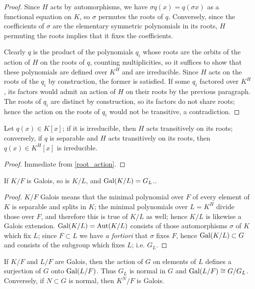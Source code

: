 \begin{proof} Since $H$ acts by automorphisms, we have $\sigma q(x) = q(\sigma
x)$ as a functional equation on $K$, so $\sigma$ permutes the roots of $q$.
Conversely, since the coefficients of $\sigma$ are the elementary symmetric
polynomials in its roots, $H$ permuting the roots implies that it fixes the
coefficients.

Clearly $q$ is the product of the polynomials $q_i$ whose roots are the orbits
of the action of $H$ on the roots of $q$, counting multiplicities, so it
suffices to show that these polynomials are defined over $K^H$ and are
irreducible.  Since $H$ acts on the roots of the $q_i$ by construction, the
former is satisfied.  If some $q_i$ factored over $K^H$, its factors would
admit an action of $H$ on their roots by the previous paragraph.  The roots of
$q_i$ are distinct by construction, so its factors do not share roots; hence
the action on the roots of $q_i$ would not be transitive, a contradiction.
\end{proof}

\begin{corollary} Let $q(x) \in K[x]$; if it is irreducible, then $H$ acts
transitively on its roots; conversely, if $q$ is separable and $H$ acts
transitively on its roots, then $q(x) \in K^H[x]$ is irreducible.
\label{sep_irred}
\end{corollary}

\begin{proof} Immediate from \cref{root_action}. \end{proof}

\begin{lemma} If $K/F$ is Galois, so is $K/L$, and $\operatorname{\text{Gal}}(K/L) = G_L$..
\label{sub_galois}
\end{lemma}

\begin{proof} $K/F$ Galois means that the minimal polynomial over $F$ of every
element of $K$ is separable and splits in $K$; the minimal polynomials over $L
= K^H$ divide those over $F$, and therefore this is true of $K/L$ as well;
hence $K/L$ is likewise a Galois extension. $\operatorname{\text{Gal}}(K/L) = \operatorname{\text{Aut}}(K/L)$ consists
of those automorphisms $\sigma$ of $K$ which fix $L$; since $F \subset L$ we
have \emph{a fortiori} that $\sigma$ fixes $F$, hence $\operatorname{\text{Gal}}(K/L) \subset G$
and consists of the subgroup which fixes $L$; i.e. $G_L$. \end{proof}

\begin{corollary} If $K/F$ and $L/F$ are Galois, then the action of $G$ on elements of $L$
defines a surjection of $G$ onto $\operatorname{\text{Gal}}(L/F)$.  Thus $G_L$ is normal in $G$ and $\operatorname{\text{Gal}}(L/F) \cong G/G_L$.  Conversely, if $N \subset G$ is normal, then $K^N/F$ is Galois.
\label{normal}
\end{corollary}

